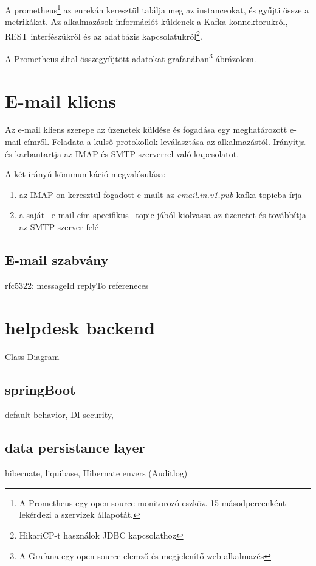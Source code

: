 A prometheus\footnote{A Prometheus egy open source monitorozó eszköz. 15 másodpercenként lekérdezi a szervizek állapotát.} az eurekán keresztül találja meg az instanceokat, és gyűjti össze a metrikákat. Az alkalmazások információt küldenek a Kafka konnektorukról, REST interfészükről és az adatbázis kapcsolatukról\footnote{HikariCP-t használok JDBC kapcsolathoz}.

A Prometheus által összegyűjtött adatokat grafanában\footnote{A Grafana egy open source elemző és megjelenítő web alkalmazés} ábrázolom.






\section{E-mail kliens}
Az e-mail kliens szerepe az üzenetek küldése és fogadása egy meghatározott e-mail címről. Feladata a külső protokollok leválasztása az alkalmazástól. Irányítja és karbantartja az IMAP és SMTP szerverrel való kapcsolatot.

A két irányú kömmunikáció megvalósulása:
\begin{enumerate}
	\item az IMAP-on keresztül fogadott e-mailt az \textit{email.in.v1.pub} kafka topicba írja
	\item a saját --e-mail cím specifikus-- topic-jából kiolvassa az üzenetet és továbbítja  az SMTP szerver felé
\end{enumerate}

\subsection{E-mail szabvány}

	rfc5322: 
	messageId
	replyTo
	refereneces







\section{helpdesk backend}
Class Diagram

\subsection{springBoot}
default behavior, DI
security, 	

\subsection{data persistance layer}
hibernate, liquibase, Hibernate envers (Auditlog)

